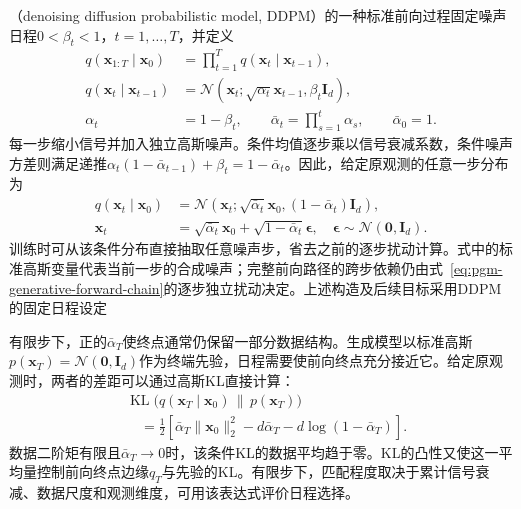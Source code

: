 （denoising diffusion probabilistic model, DDPM）的一种标准前向过程固定噪声日程$0<\beta_t<1$，$t=1,\ldots,T$，并定义
\begin{equation}
  \label{eq:pgm-generative-forward-chain}
  \begin{aligned}
    q(\bm{x}_{1:T}\mid\bm{x}_0)
      &=\prod_{t=1}^{T}q(\bm{x}_t\mid\bm{x}_{t-1}),\\
    q(\bm{x}_t\mid\bm{x}_{t-1})
      &=\mathcal{N}(\bm{x}_t;
          \sqrt{\alpha_t}\bm{x}_{t-1},\beta_t\bm{I}_d),\\
    \alpha_t&=1-\beta_t,\qquad
    \bar{\alpha}_t=\prod_{s=1}^{t}\alpha_s,\qquad
    \bar{\alpha}_0=1.
  \end{aligned}
\end{equation}
每一步缩小信号并加入独立高斯噪声。条件均值逐步乘以信号衰减系数，条件噪声方差则满足递推$\alpha_t(1-\bar{\alpha}_{t-1})+\beta_t=1-\bar{\alpha}_t$。因此，给定原观测的任意一步分布为
\begin{equation}
  \label{eq:pgm-generative-forward-marginal}
  \begin{aligned}
    q(\bm{x}_t\mid\bm{x}_0)
      &=\mathcal{N}(\bm{x}_t;
          \sqrt{\bar{\alpha}_t}\bm{x}_0,
          (1-\bar{\alpha}_t)\bm{I}_d),\\
    \bm{x}_t&=\sqrt{\bar{\alpha}_t}\bm{x}_0+
              \sqrt{1-\bar{\alpha}_t}\bm{\epsilon},
    \quad \bm{\epsilon}\sim\mathcal{N}(\bm{0},\bm{I}_d).
  \end{aligned}
\end{equation}
训练时可从该条件分布直接抽取任意噪声步，省去之前的逐步扰动计算。式中的标准高斯变量代表当前一步的合成噪声；完整前向路径的跨步依赖仍由式~\eqref{eq:pgm-generative-forward-chain}的逐步独立扰动决定。上述构造及后续目标采用DDPM的固定日程设定

有限步下，正的$\bar{\alpha}_T$使终点通常仍保留一部分数据结构。生成模型以标准高斯$p(\bm{x}_T)=\mathcal{N}(\bm{0},\bm{I}_d)$作为终端先验，日程需要使前向终点充分接近它。给定原观测时，两者的差距可以通过高斯KL直接计算：
\begin{equation}
  \label{eq:pgm-generative-terminal-kl}
  \begin{aligned}
    &\operatorname{KL}\bigl(
        q(\bm{x}_T\mid\bm{x}_0)\,\|\,p(\bm{x}_T)\bigr)\\
    &\quad=\frac12\left[
       \bar{\alpha}_T\lVert\bm{x}_0\rVert_2^2
       -d\bar{\alpha}_T-d\log(1-\bar{\alpha}_T)
      \right].
  \end{aligned}
\end{equation}
数据二阶矩有限且$\bar{\alpha}_T\to0$时，该条件KL的数据平均趋于零。KL的凸性又使这一平均量控制前向终点边缘$q_T$与先验的KL。有限步下，匹配程度取决于累计信号衰减、数据尺度和观测维度，可用该表达式评价日程选择。

